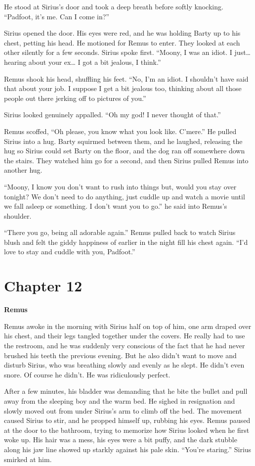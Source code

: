 \documentclass[12pt,twoside,openright]{memoir}
\begin{document}
He stood at Sirius's door and took a deep breath before softly knocking. ``Padfoot, it's me. Can I come in?''

Sirius opened the door. His eyes were red, and he was holding Barty up to his chest, petting his head. He motioned for Remus to enter. They looked at each other silently for a few seconds. Sirius spoke first. ``Moony, I was an idiot. I just… hearing about your ex… I got a bit jealous, I think.''

Remus shook his head, shuffling his feet. ``No, I'm an idiot. I shouldn't have said that about your job. I suppose I get a bit jealous too, thinking about all those people out there jerking off to pictures of you.''

Sirius looked genuinely appalled. ``Oh my god! I never thought of that.''

Remus scoffed, ``Oh please, you know what you look like. C'mere.'' He pulled Sirius into a hug. Barty squirmed between them, and he laughed, releasing the hug so Sirius could set Barty on the floor, and the dog ran off somewhere down the stairs. They watched him go for a second, and then Sirius pulled Remus into another hug.

``Moony, I know you don't want to rush into things but, would you stay over tonight? We don't need to do anything, just cuddle up and watch a movie until we fall asleep or something. I don't want you to go.'' he said into Remus's shoulder.

``There you go, being all adorable again.'' Remus pulled back to watch Sirius blush and felt the giddy happiness of earlier in the night fill his chest again. ``I'd love to stay and cuddle with you, Padfoot.''

\chapter*{Chapter 12}

\textbf{Remus} 

Remus awoke in the morning with Sirius half on top of him, one arm draped over his chest, and their legs tangled together under the covers. He really had to use the restroom, and he was suddenly very conscious of the fact that he had never brushed his teeth the previous evening. But he also didn't want to move and disturb Sirius, who was breathing slowly and evenly as he slept. He didn't even snore. Of course he didn't. He was ridiculously perfect.

After a few minutes, his bladder was demanding that he bite the bullet and pull away from the sleeping boy and the warm bed. He sighed in resignation and slowly moved out from under Sirius's arm to climb off the bed. The movement caused Sirius to stir, and he propped himself up, rubbing his eyes. Remus paused at the door to the bathroom, trying to memorize how Sirius looked when he first woke up. His hair was a mess, his eyes were a bit puffy, and the dark stubble along his jaw line showed up starkly against his pale skin. ``You're staring.'' Sirius smirked at him.
\end{document}
